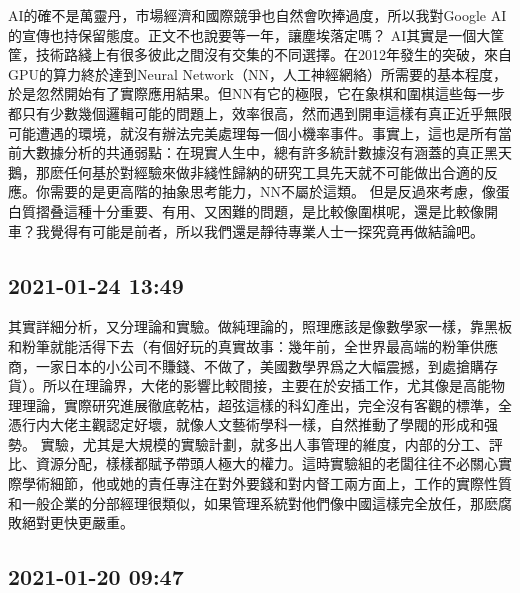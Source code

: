\documentclass[twocolumn]{ctexart}
\begin{document}
AI的確不是萬靈丹，市場經濟和國際競爭也自然會吹捧過度，所以我對Google AI的宣傳也持保留態度。正文不也說要等一年，讓塵埃落定嗎？
AI其實是一個大筐筐，技術路綫上有很多彼此之間沒有交集的不同選擇。在2012年發生的突破，來自GPU的算力終於達到Neural Network（NN，人工神經網絡）所需要的基本程度，於是忽然開始有了實際應用結果。但NN有它的極限，它在象棋和圍棋這些每一步都只有少數幾個邏輯可能的問題上，效率很高，然而遇到開車這樣有真正近乎無限可能遭遇的環境，就沒有辦法完美處理每一個小機率事件。事實上，這也是所有當前大數據分析的共通弱點：在現實人生中，總有許多統計數據沒有涵蓋的真正黑天鵝，那麽任何基於對經驗來做非綫性歸納的研究工具先天就不可能做出合適的反應。你需要的是更高階的抽象思考能力，NN不屬於這類。
但是反過來考慮，像蛋白質摺叠這種十分重要、有用、又困難的問題，是比較像圍棋呢，還是比較像開車？我覺得有可能是前者，所以我們還是靜待專業人士一探究竟再做結論吧。
\subsection*{2021-01-24 13:49}

其實詳細分析，又分理論和實驗。做純理論的，照理應該是像數學家一樣，靠黑板和粉筆就能活得下去（有個好玩的真實故事：幾年前，全世界最高端的粉筆供應商，一家日本的小公司不賺錢、不做了，美國數學界爲之大幅震撼，到處搶購存貨）。所以在理論界，大佬的影響比較間接，主要在於安插工作，尤其像是高能物理理論，實際研究進展徹底乾枯，超弦這樣的科幻產出，完全沒有客觀的標準，全憑行内大佬主觀認定好壞，就像人文藝術學科一樣，自然推動了學閥的形成和强勢。
實驗，尤其是大規模的實驗計劃，就多出人事管理的維度，内部的分工、評比、資源分配，樣樣都賦予帶頭人極大的權力。這時實驗組的老闆往往不必關心實際學術細節，他或她的責任專注在對外要錢和對内督工兩方面上，工作的實際性質和一般企業的分部經理很類似，如果管理系統對他們像中國這樣完全放任，那麽腐敗絕對更快更嚴重。
\subsection*{2021-01-20 09:47}
\end{document}
